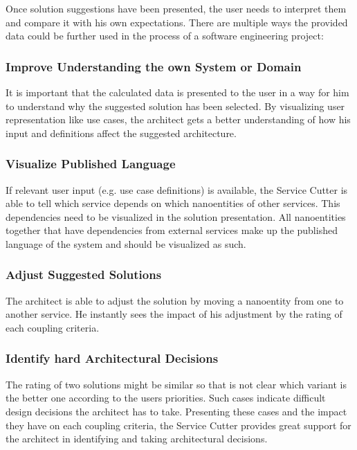 Once solution suggestions have been presented, the user needs to interpret them and compare it with his own expectations. There are multiple ways the provided data could be further used in the process of a software engineering project:

\subsubsection{Improve Understanding the own System or Domain}

It is important that the calculated data is presented to the user in a way for him to understand why the suggested solution has been selected. By visualizing user representation like use cases, the architect gets a better understanding of how his input and definitions affect the suggested architecture. 

\subsubsection{Visualize Published Language}

If relevant user input (e.g. use case definitions) is available, the Service Cutter is able to tell which service depends on which nanoentities of other services. This dependencies need to be visualized in the solution presentation. All nanoentities together that have dependencies from external services make up the published language of the system and should be visualized as such.

\subsubsection{Adjust Suggested Solutions}

The architect is able to adjust the solution by moving a nanoentity from one to another service. He instantly sees the impact of his adjustment by the rating of each coupling criteria.

\subsubsection{Identify hard Architectural Decisions}

The rating of two solutions might be similar so that is not clear which variant is the better one according to the users priorities. Such cases indicate difficult design decisions the architect has to take. Presenting these cases and the impact they have on each coupling criteria, the Service Cutter provides great support for the architect in identifying and taking architectural decisions.

